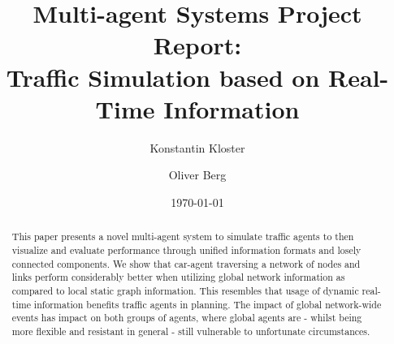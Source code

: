 \documentclass[10pt, oneside]{article}
\title{Multi-agent Systems Project Report: \\
    Traffic Simulation based on Real-Time Information}
\author[]{Konstantin Kloster}
\author[]{Oliver Berg}
\affil[1]{Technical University Kaiserslautern}
\date{\today}
\begin{document}
\maketitle


\bigskip
\begin{abstract}
    This paper presents a novel multi-agent system to simulate traffic agents to then visualize and evaluate performance through unified information formats and losely connected components.
    We show that car-agent traversing a network of nodes and links perform considerably better when utilizing global network information as compared to local static graph information. This resembles that usage of dynamic real-time information benefits traffic agents in planning.
    The impact of global network-wide events has impact on both groups of agents, where global agents are - whilst being more flexible and resistant in general - still vulnerable to unfortunate circumstances.
\end{abstract}

\newpage
\setcounter{tocdepth}{2}
\tableofcontents

\newpage
\newpage
\newpage
\newpage
\newpage
\newpage



\newpage



\end{document}
